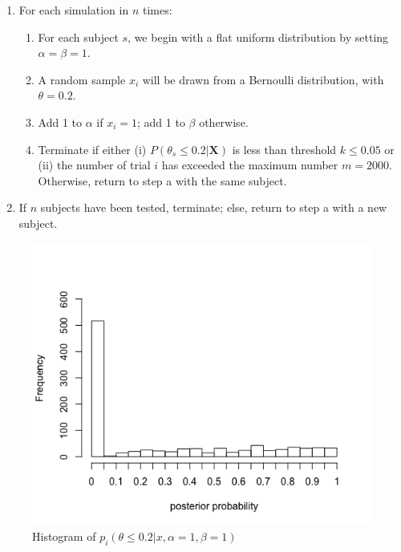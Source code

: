 \begin{enumerate}
\def\labelenumi{\arabic{enumi}.}
\tightlist
\item
  For each simulation in \(n\) times:

  \begin{enumerate}
  \def\labelenumii{\alph{enumii}.}
  \tightlist
  \item
    For each subject \(s\), we begin with a flat uniform distribution by
    setting \(\alpha = \beta = 1\).
  \item
    A random sample \(x_i\) will be drawn from a Bernoulli distribution,
    with \(\theta = 0.2\).
  \item
    Add 1 to \(\alpha\) if \(x_i =1\); add 1 to \(\beta\) otherwise.
  \item
    Terminate if either (i) \(P(\theta_s \leq 0.2|\mathbf{X})\) is less
    than threshold \(k\leq 0.05\) or (ii) the number of trial \(i\) has exceeded
    the maximum number \(m=2000\). Otherwise, return to step a with the same
    subject.
  \end{enumerate}
\item
  If \(n\) subjects have been tested, terminate; else, return to step a
  with a new subject.

\end{enumerate}



\begin{figure}[h] 
\begin{center}
\includegraphics[scale=0.5]{Bayesstopflatallpost.png}
	\caption{Histogram of $p_i(\theta\leq 0.2|x,\alpha=1, \beta=1)$}
	\label{fig:bayesflatposterior}
\end{center}	
\end{figure}

